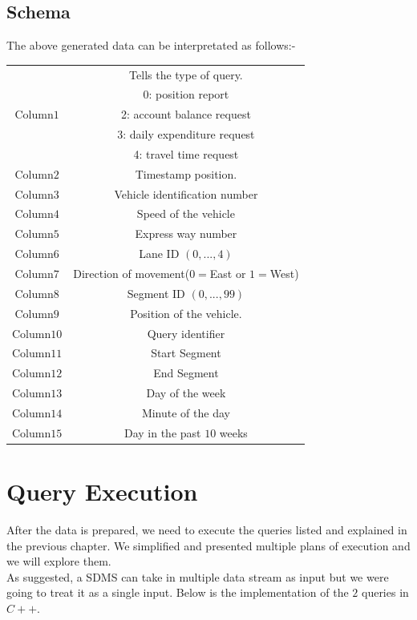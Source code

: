 \subsection{Schema}
The above generated data can be interpretated as follows:-\\
\begin{tabular}{ |c|c| } 
 \hline
  \multirow{5}{4em}{Column$1$} & Tells the type of query. \\  
            &	0: position report\\
			&	2: account balance request\\
			&	3: daily expenditure request\\
			&	4: travel time request	\\
 \hline
  Column$2$ & Timestamp position. \\  
 \hline
  Column$3$ & Vehicle identification number\\  
 \hline
  Column$4$ & Speed of the vehicle \\  
 \hline
  Column$5$ & Express way number \\  
 \hline
  Column$6$ & Lane ID $(0,...,4)$\\  
 \hline
  Column$7$ & Direction of movement($0=$East or $1=$West) \\  
 \hline
  Column$8$ & Segment ID $(0,...,99)$ \\
 \hline
  Column$9$ & Position of the vehicle. \\  
 \hline
  Column$10$ & Query identifier \\  
 \hline
  Column$11$ & Start Segment \\  
 \hline
  Column$12$ & End Segment \\  
 \hline
  Column$13$ & Day of the week \\  
 \hline
  Column$14$ & Minute of the day \\  
 \hline
  Column$15$ & Day in the past $10$ weeks \\  
 \hline
\end{tabular}

\section{Query Execution}
After the data is prepared, we need to execute the queries listed and explained in the previous chapter. We simplified and presented multiple plans of execution and we will explore them.\\
As suggested, a SDMS can take in multiple data stream as input but we were going to treat it as a single input. Below is the implementation of the $2$ queries in $C++$.
